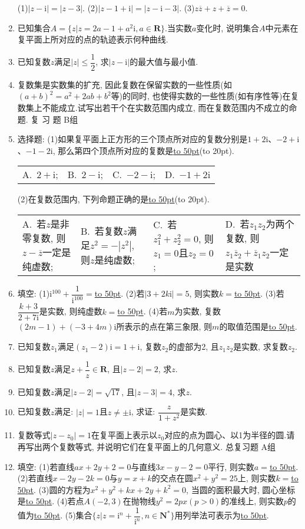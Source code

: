 \documentclass[10pt,a4paper]{article}
\newcommand{\blank}[1]{\underline{\hbox to #1pt{}}}
\newcommand{\bracket}[1]{(\hbox to #1pt{})}
\newcommand{\fourch}[4]{\par\begin{tabular}{p{.23\textwidth}p{.23\textwidth}p{.23\textwidth}p{.23\textwidth}}
A.~#1 &B.~#2& C.~#3& D.~#4
\end{tabular}}
\begin{document}
\begin{enumerate}[1.]
(1)$|z-\mathrm{i}|=|z-3|$.						(2)$|z-1+\mathrm{i}|=|z-\mathrm{i}-3|$.
(3)$z\overline z+z+\overline z=0$.
\item 已知集合$A=\{z|z=2a-1+a^2\mathrm{i},a\in \mathbf{R}\}$.当实数$a$变化时, 说明集合$A$中元素在复平面上所对应的点的轨迹表示何种曲线.
\item 已知复数$z$满足$|z|\le \dfrac 12$, 求$|z-\mathrm{i}|$的最大值与最小值.
\item 复数集是实数集的扩充, 因此复数在保留实数的一些性质(如$(a+b)^2=a^2+2ab+b^2$等)的同时, 也使得实数的一些性质(如有序性等)在复数集上不能成立.试写出若干个在实数范围内成立, 而在复数范围内不成立的命题.
复 习 题
B组
\item 选择题:
(1)如果复平面上正方形的三个顶点所对应的复数分别是$1+2\mathrm{i}$、$-2+\mathrm{i}$、$-1-2\mathrm{i}$, 那么第四个顶点所对应的复数是\blank{50}\bracket{20}.
\fourch{$2+\mathrm{i}$;}{$2-\mathrm{i}$;}{$-2-\mathrm{i}$;}{$-1+2\mathrm{i}$}
(2)在复数范围内, 下列命题正确的是\blank{50}\bracket{20}.
\fourch{若$z$是非零复数, 则$z-\overline z$一定是纯虚数;}{若复数$z$满足$z^2=-|z^2|$, 则$z$是纯虚数;}{若$z_1^2+z_2^2=0$, 则$z_1=0$且$z_2=0$;}{若$z_1z_2$为两个复数, 则$z_1\overline  z_2+\overline  z_1z_2$一定是实数}
\item 填空:
(1)$\mathrm{i}^{100}+\dfrac 1{\mathrm{i}^{100}}=$\blank{50}.
(2)若$|3+2k\mathrm{i}|=5$, 则实数$k=$\blank{50}.
(3)若$\dfrac{k+3}{2+7\mathrm{i}}$是实数, 则纯虚数$k=$\blank{50}.
(4)若$m$为实数, 复数$(2m-1)+(-3+4m)\mathrm{i}$所表示的点在第三象限, 则$m$的取值范围是\blank{50}.
\item 已知复数$z_1$满足$(z_1-2)\mathrm{i}=1+\mathrm{i}$, 复数$z_2$的虚部为2, 且$z_1z_2$是实数, 求复数$z_2$.
\item 已知复数$z$满足$z+\dfrac 1z\in \mathbf{R}$, 且$|z-2|=2$, 求$z$.
\item 已知复数$z$满足$|z-2|=\sqrt {17}$, 且$|z-3|=4$, 求$z$.
\item 已知复数$z$满足: $|z|=1$且$z\ne \pm \mathrm{i}$, 求证: $\dfrac z{1+z^2}$是实数.
\item 复数等式$|z-z_0|=1$在复平面上表示以$z_0$对应的点为圆心、以1为半径的圆.请再写出两个复数等式, 并说明它们在复平面上的几何意义.
总复习题
A组
\item 填空:
(1)若直线$ax+2y+2=0$与直线$3x-y-2=0$平行, 则实数$a=$\blank{50}.
(2)若直线$x-2y-2k=0$与$y=x+k$的交点在圆$x^2+y^2=25$上, 则实数$k=$\blank{50}.
(3)圆的方程为$x^2+y^2+kx+2y+k^2=0$, 当圆的面积最大时, 圆心坐标是\blank{50}.
(4)若点$A(-2,3)$在抛物线$y^2=2px(p>0)$的准线上, 则实数$p$的值为\blank{50}.
(5)集合$\{z|z=\mathrm{i}^n+\dfrac 1{\mathrm{i}^n},n\in \mathbf{N}^*\}$用列举法可表示为\blank{50}.

\end{enumerate}
\end{document}

